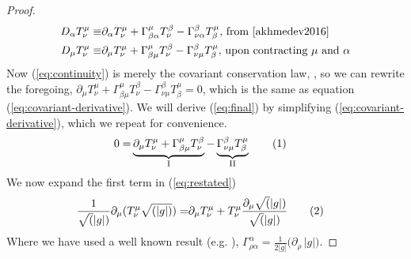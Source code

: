\documentclass[]{article}
\newcommand\numberthis{\addtocounter{equation}{1}\tag{\theequation}}
\begin{document}
\begin{proof}
	\begin{align*}
	D_{\alpha} T^{\mu}_{\nu} 
	\equiv & \partial_{\alpha} T^{\mu}_{\nu} + \Gamma^{\mu}_{\beta\alpha}T^{\beta}_{\nu}-\Gamma^{\beta}_{\nu\alpha}T^{\mu}_{\beta} \text{, from \cite[(34)]{akhmedev2016}}\\
	D_{\mu} T^{\mu}_{\nu}
	\equiv & \partial_{\mu} T^{\mu}_{\nu} + \Gamma^{\mu}_{\beta\mu}T^{\beta}_{\nu}-\Gamma^{\beta}_{\nu\mu}T^{\mu}_{\beta}\text{, upon contracting $\mu$ and $\alpha$}
	\end{align*}
	Now (\ref{eq:continuity}) is merely the covariant conservation law, \cite[(80)]{akhmedev2016}, so we can rewrite the foregoing,
	$\partial_{\mu} T^{\mu}_{\nu} + \Gamma^{\mu}_{\beta\mu}T^{\beta}_{\nu}-\Gamma^{\beta}_{\nu\mu}T^{\mu}_{\beta}=0$, which is the same as equation (\ref{eq:covariant-derivative}). We will derive (\ref{eq:final}) by simplifying (\ref{eq:covariant-derivative}), which we repeat for convenience.
	\begin{align*}
	0= & \underbrace{\partial_{\mu} T^{\mu}_{\nu} + \Gamma^{\mu}_{\beta\mu}T^{\beta}_{\nu}}_\text{I}-\underbrace{\Gamma^{\beta}_{\nu\mu}T^{\mu}_{\beta}}_\text{II}\numberthis\label{eq:restated}
	\end{align*}
	We now expand the first term in (\ref{eq:restated})
	\begin{align*}
		\frac{1}{\sqrt(|g|)}\partial_{\mu}(T^{\mu}_{\nu}\sqrt{(|g|)}) =&\partial_{\mu}T^{\mu}_{\nu} + T^{\mu}_{\nu}\frac{\partial_{\mu}\sqrt(|g|)}{\sqrt(|g|)} \numberthis\label{eq:term1}
	\end{align*}
	Where we have used a well known result (e.g. \cite[equation (3.11)]{abs1965}), $\Gamma^{\alpha}_{\rho\alpha}=\frac{1}{2|g|}\big(\partial_\rho \, |g|\big)$.
	

\end{proof}
\end{document}
